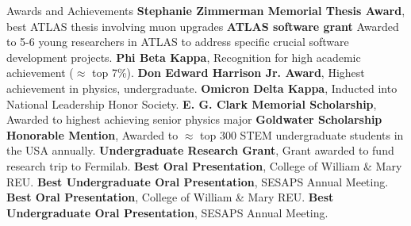 \begin{rubric}{Awards and Achievements}
\entry*[2024] \textbf{Stephanie Zimmerman Memorial Thesis Award}, best ATLAS thesis involving muon upgrades
%
\entry*[2024] \textbf{ATLAS software grant} Awarded to 5-6 young researchers in ATLAS to address specific crucial software development projects.
%
\entry*[2017] \textbf{Phi Beta Kappa}, Recognition for high academic achievement ($\approx$ top 7\%).
%
\entry*[2017] \textbf{Don Edward Harrison Jr. Award}, Highest achievement in physics, undergraduate.
%
\entry*[2017] \textbf{Omicron Delta Kappa}, Inducted into National Leadership Honor Society.
%
\entry*[2017]\textbf{E. G. Clark Memorial Scholarship}, Awarded to highest achieving senior physics major
%
\entry*[2017] \textbf{Goldwater Scholarship Honorable Mention}, Awarded to $\approx$ top 300 STEM undergraduate students in the USA annually.
%
\entry*[2017] \textbf{Undergraduate Research Grant}, Grant awarded to fund research trip to Fermilab.
%
\entry*[2016] \textbf{Best Oral Presentation}, College of William \& Mary REU.
%
\entry*[2016] \textbf{Best Undergraduate Oral Presentation}, SESAPS Annual Meeting.
%
\entry*[2015] \textbf{Best Oral Presentation}, College of William \& Mary REU.
%
\entry*[2015] \textbf{Best Undergraduate Oral Presentation}, SESAPS Annual Meeting.
%
\end{rubric}